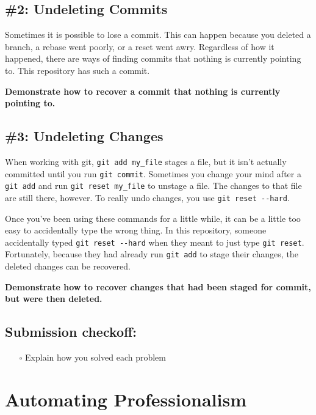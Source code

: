 \documentclass{article}
\begin{document}
\subsection*{\#2: Undeleting Commits}

Sometimes it is possible to lose a commit. This can happen because you deleted
a branch, a rebase went poorly, or a reset went awry. Regardless of how it
happened, there are ways of finding commits that nothing is currently pointing
to. This repository has such a commit.

\noindent
\textbf{Demonstrate how to recover a commit that nothing is currently pointing to.}


\subsection*{\#3: Undeleting Changes}

When working with git, \texttt{git~add~my\_file} stages a file, but it isn't
actually committed until you run \texttt{git~commit}. Sometimes you change
your mind after a \texttt{git~add} and run \texttt{git~reset~my\_file} to
unstage a file. The changes to that file are still there, however. To really
undo changes, you use \texttt{git~reset~-{}-hard}.

\medskip
\noindent
Once you've been using these commands for a little while, it can be a little
too easy to accidentally type the wrong thing. In this repository, someone
accidentally typed \texttt{git~reset~-{}-hard} when they meant to just type
\texttt{git~reset}. Fortunately, because they had already run \texttt{git~add}
to stage their changes, the deleted changes can be recovered.

\noindent
\textbf{Demonstrate how to recover changes that had been staged for commit,
but were then deleted.}


\subsection*{Submission checkoff:}
\begin{itemize}
  \item[$\square$] Explain how you solved each problem
\end{itemize}


\newpage
\section{Automating Professionalism}
\end{document}

